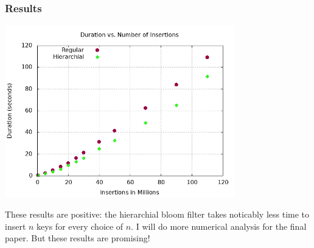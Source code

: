 \documentclass[a4paper]{article}
\theoremstyle{plain}
\theoremstyle{definition}
\begin{document}
	\subsubsection{Results}
	\begin{center}
		\includegraphics[width=10cm]{../plots/scale-nm.png}
	\end{center}

	These results are positive: the hierarchial bloom filter takes noticably less time to insert $n$ keys for every choice of $n$.
	I will do more numerical analysis for the final paper. But these results are promising!
	\newpage
	

	
\end{document}
